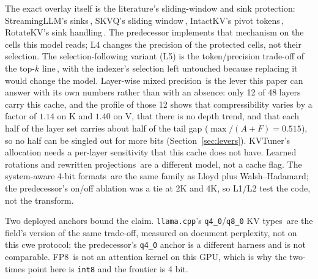 \documentclass[10pt,twocolumn]{article}
\begin{document}
The exact overlay itself is the literature's sliding-window and sink protection: StreamingLLM's sinks\,\cite{streamingllm}, SKVQ's sliding window\,\cite{skvq}, IntactKV's pivot tokens\,\cite{intactkv}, RotateKV's sink handling\,\cite{rotatekv}. The predecessor implements that mechanism on the cells this model reads; L4 changes the precision of the protected cells, not their selection. The selection-following variant (L5) is the token/precision trade-off of the top-$k$ line\,\cite{top-k}, with the indexer's selection left untouched because replacing it would change the model. Layer-wise mixed precision\,\cite{kvtuner} is the lever this paper can answer with its own numbers rather than with an absence: only 12 of 48 layers carry this cache, and the profile of those 12 shows that compressibility varies by a factor of $1.14$ on K and $1.40$ on V, that there is no depth trend, and that each half of the layer set carries about half of the tail gap ($\max/(A+F) = 0.515$), so no half can be singled out for more bits (Section~\ref{sec:levers}). KVTuner's allocation needs a per-layer sensitivity that this cache does not have. Learned rotations and rewritten projections\,\cite{quarot,spinquant,palu} are a different model, not a cache flag. The system-aware 4-bit formats\,\cite{sawint4} are the same family as Lloyd plus Walsh--Hadamard; the predecessor's on/off ablation was a tie at 2K and 4K, so L1/L2 test the code, not the transform.

Two deployed anchors bound the claim. \texttt{llama.cpp}'s \texttt{q4\_0}/\texttt{q8\_0} KV types\,\cite{llama-cpp} are the field's version of the same trade-off, measured on document perplexity, not on this cwe protocol; the predecessor's \texttt{q4\_0} anchor is a different harness and is not comparable. FP8\,\cite{vllm-fp8} is not an attention kernel on this GPU, which is why the two-times point here is \texttt{int8} and the frontier is 4 bit.
\end{document}
